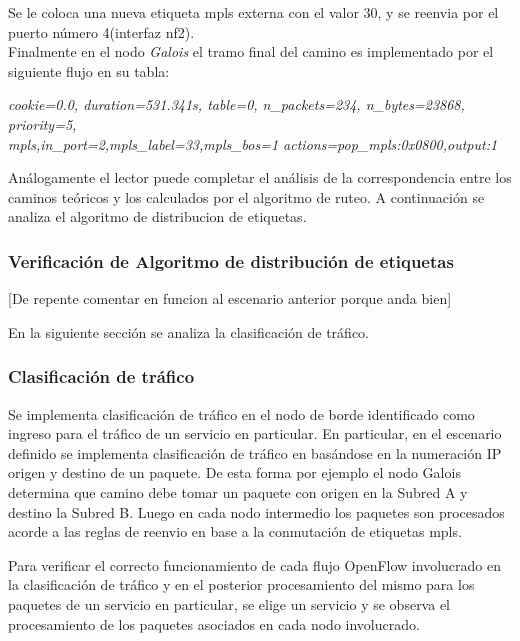 Se le coloca una nueva etiqueta mpls externa con el valor 30, y se reenvia por el puerto n\'umero 4(interfaz nf2).\\

Finalmente en el nodo \textit{Galois} el tramo final del camino es implementado por el siguiente flujo en su tabla:

\begin{center}
\textit{cookie=0.0, duration=531.341s, table=0, n\_packets=234, n\_bytes=23868, priority=5, \\
mpls,in\_port=2,mpls\_label=33,mpls\_bos=1 actions=pop\_mpls:0x0800,output:1 }
\end{center}

Análogamente el lector puede completar el análisis de la correspondencia entre los caminos te\'oricos y los calculados por el algoritmo de ruteo. A continuaci\'on se analiza el algoritmo de distribucion de etiquetas.

\subsubsection{Verificaci\'on de Algoritmo de distribución de etiquetas}

[De repente comentar en funcion al escenario anterior porque anda bien]

En la siguiente secci\'on se analiza la clasificaci\'on de tr\'afico.

\subsubsection{Clasificaci\'on de tr\'afico}
Se implementa clasificaci\'on de tr\'afico en el nodo de borde identificado como ingreso para el tr\'afico de un servicio en particular. En particular, en el escenario definido se implementa clasificaci\'on de tr\'afico en basándose en la numeraci\'on IP origen y destino de un paquete. De esta forma por ejemplo el nodo Galois determina que camino debe tomar un paquete con origen en la Subred A y destino la Subred B. Luego en cada nodo intermedio los paquetes son procesados acorde a las reglas de reenvio en base a la conmutación de etiquetas mpls.

Para verificar el correcto funcionamiento de cada flujo OpenFlow involucrado en la clasificaci\'on de tr\'afico y en el posterior procesamiento del mismo para los paquetes de un servicio en particular, se elige un servicio y se observa el procesamiento de los paquetes asociados en cada nodo involucrado.\\

